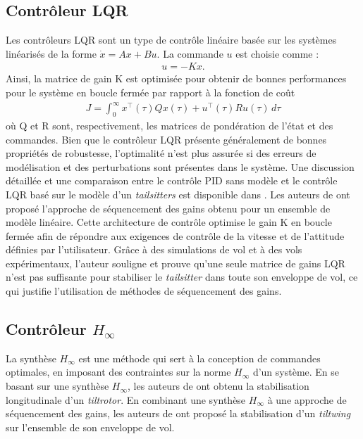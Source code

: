 \subsection*{Contrôleur LQR}
Les contrôleurs LQR sont un type de contrôle linéaire basée sur les systèmes linéarisés de la forme $\dot{x} = Ax+Bu$. La commande $u$ est
choisie comme :
\begin{align*}
    u = -Kx.
\end{align*}
Ainsi, la matrice de gain K est optimisée pour obtenir de bonnes performances pour le système en boucle fermée par rapport à la fonction de coût
\begin{align*}
    J = \int_{0}^{\infty} x^{\top}(\tau)Q x(\tau) + u^{\top}(\tau)R u(\tau) \,d\tau
\end{align*}
où Q et R sont, respectivement, les matrices de pondération de l'état et des commandes. Bien que le contrôleur LQR présente généralement de bonnes propriétés de robustesse, l'optimalité n'est plus assurée si des erreurs de modélisation et des perturbations sont présentes dans le système. Une discussion détaillée et une comparaison entre le contrôle PID sans modèle et le contrôle LQR basé sur le modèle d'un \textit{tailsitters} est disponible dans \cite{BarthCondomines2018}.
Les auteurs de \cite{Lustosa2017LaP} ont proposé l'approche de séquencement des gains obtenu pour un ensemble de modèle linéaire. Cette architecture de contrôle optimise le gain K en boucle fermée afin de répondre aux exigences de contrôle de la vitesse et de l'attitude définies par l'utilisateur. Grâce à des simulations de vol et à des vols expérimentaux, l'auteur souligne et prouve qu'une seule matrice de gains LQR n'est pas suffisante pour stabiliser le \textit{tailsitter} dans toute son enveloppe de vol, ce qui justifie l'utilisation de méthodes de séquencement des gains.

\subsection*{Contrôleur $H_{\infty}$}
La synthèse $H_{\infty}$ est une méthode qui sert à la conception de commandes optimales, en imposant des contraintes sur la norme $H_{\infty}$ d'un système. En se basant sur une synthèse $H_{\infty}$, les auteurs de \cite{SunYang2009} ont obtenu la stabilisation longitudinale d'un \textit{tiltrotor}. En combinant une synthèse $H_{\infty}$ à une approche de séquencement des gains, les auteurs de \cite{DickesonMix2005, DickesonCifdaloz2006,DickesonMiles2007} ont proposé la stabilisation d'un \textit{tiltwing} sur l'ensemble de son enveloppe de vol. 

